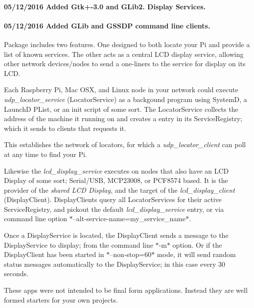 \paragraph*{05/12/2016 Added Gtk+-\/3.0 and G\+Lib2. Display Services.}

\paragraph*{05/12/2016 Added G\+Lib and G\+S\+S\+D\+P command line clients.}



Package includes two features. One designed to both locate your Pi and provide a list of known services. The other acts as a central L\+C\+D display service, allowing other network devices/nodes to send a one-\/liners to the service for display on its L\+C\+D.

Each Raspberry Pi, Mac O\+S\+X, and Linux node in your network could execute {\itshape udp\+\_\+locator\+\_\+service} (Locator\+Service) as a backgound program using System\+D, a Launch\+D P\+List, or an init script of some sort. The Locator\+Service collects the address of the machine it running on and creates a entry in its Service\+Registry; which it sends to clients that requests it.

This establishes the network of locators, for which a {\itshape udp\+\_\+locator\+\_\+client} can poll at any time to find your Pi.

Likewise the {\itshape lcd\+\_\+display\+\_\+service} executes on nodes that also have an L\+C\+D Display of some sort; Serial/\+U\+S\+B, M\+C\+P23008, or P\+C\+F8574 based. It is the provider of the {\itshape shared L\+C\+D Display}, and the target of the {\itshape lcd\+\_\+display\+\_\+client} (Display\+Client). Display\+Clients query all Locator\+Services for their active Service\+Registry, and pickout the default {\itshape lcd\+\_\+display\+\_\+service} entry, or via command line option $\ast$--alt-\/service-\/name=my\+\_\+service\+\_\+name$\ast$.

Once a Display\+Service is located, the Display\+Client sends a message to the Display\+Service to display; from the command line $\ast$-\/m$\ast$ option. Or if the Display\+Client has been started in $\ast$--non-\/stop=60$\ast$ mode, it will send random status messages automatically to the Display\+Service; in this case every 30 seconds.

These apps were not intended to be final form applications. Instead they are well formed starters for your own projects.

